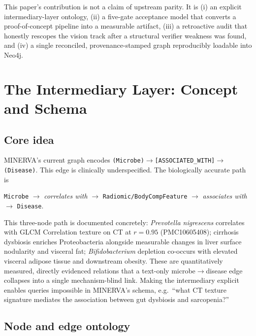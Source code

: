 \documentclass[10pt,twocolumn,letterpaper]{article}
\begin{document}
This paper's contribution is not a claim of upstream parity. It is (i) an
explicit intermediary-layer ontology, (ii) a five-gate acceptance model that
converts a proof-of-concept pipeline into a measurable artifact, (iii) a
retroactive audit that honestly rescopes the vision track after a structural
verifier weakness was found, and (iv) a single reconciled, provenance-stamped
graph reproducibly loadable into Neo4j.

\section{The Intermediary Layer: Concept and Schema}

\subsection{Core idea}

MINERVA's current graph encodes
\texttt{(Microbe)$\rightarrow$[ASSOCIATED\_WITH]$\rightarrow$(Disease)}. This
edge is clinically underspecified. The biologically accurate path is

\begin{center}
\small
\texttt{Microbe} $\rightarrow$ \textit{correlates with} $\rightarrow$
\texttt{Radiomic/BodyComp\-Feature} $\rightarrow$ \textit{associates with}
$\rightarrow$ \texttt{Disease}.
\end{center}

This three-node path is documented concretely: \textit{Prevotella
nigrescens} correlates with GLCM Correlation texture on CT at $r=0.95$
(PMC10605408); cirrhosis dysbiosis enriches Proteobacteria alongside
measurable changes in liver surface nodularity and visceral fat;
\textit{Bifidobacterium} depletion co-occurs with elevated visceral adipose
tissue and downstream obesity. These are quantitatively measured, directly
evidenced relations that a text-only microbe$\rightarrow$disease edge
collapses into a single mechanism-blind link. Making the intermediary
explicit enables queries impossible in MINERVA's schema, e.g.\ ``what CT
texture signature mediates the association between gut dysbiosis and
sarcopenia?''

\subsection{Node and edge ontology}
\end{document}
